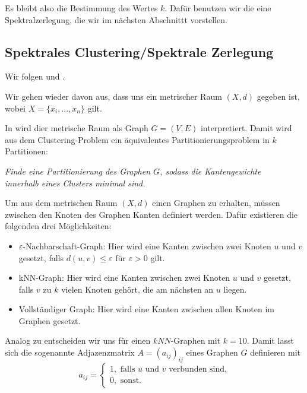 \documentclass[11pt,a4paper]{article}
\numberwithin{equation}{section}
\begin{document}
	Es bleibt also die Bestimmung des Wertes $k$.
	Dafür benutzen wir die eine Spektralzerlegung, die wir im nächsten Abschnittt vorstellen.
	
	
	\subsection{Spektrales Clustering/Spektrale Zerlegung}
	Wir folgen \cite{spectralClustering_tut} und \cite{unmaskingCH}.
	
	Wir gehen wieder davon aus, dass uns ein metrischer Raum $(X,d)$ gegeben ist, wobei $X = \lbrace x_i, ..., x_n \rbrace$ gilt.
	
	In \cite{spectralClustering_tut} wird dier metrische Raum als Graph $G=(V,E)$ interpretiert. Damit wird aus dem Clustering-Problem ein äquivalentes Partitionierungsproblem in $k$ Partitionen:
	\begin{center}
		\textit{Finde eine Partitionierung des Graphen $G$, sodass die Kantengewichte \\innerhalb eines Clusters minimal sind.}
	\end{center}
	Um aus dem metrischen Raum $(X,d)$ einen Graphen zu erhalten, müssen zwischen den Knoten des Graphen Kanten definiert werden. Dafür existieren die folgenden drei Möglichkeiten:
	
	\begin{itemize}
		\item $\varepsilon$-Nachbarschaft-Graph: Hier wird eine Kanten zwischen zwei Knoten $u$ und $v$ gesetzt, falls $d(u,v) \leq \varepsilon$ für $\varepsilon > 0$ gilt.\\
		\item kNN-Graph: Hier wird eine Kanten zwischen zwei Knoten $u$ und $v$ gesetzt, falls $v$ zu $k$ vielen Knoten gehört, die am nächsten an $u$ liegen.\\
		\item Vollständiger Graph: Hier wird eine Kanten zwischen allen Knoten im Graphen gesetzt.
	\end{itemize}
	
	Analog zu \cite{unmaskingCH} entscheiden wir uns für einen $kNN$-Graphen mit $k=10$. Damit lasst sich die sogenannte Adjazenzmatrix $A = (a_{ij})_{ij}$ eines Graphen $G$ definieren mit
	\begin{equation}
	a_{ij} = \begin{cases}
	1, \text{ falls  } u \text{ und } v \text{ verbunden sind,}\\
	0, \text{ sonst.}
	\end{cases}
	\end{equation}
	
\end{document}
